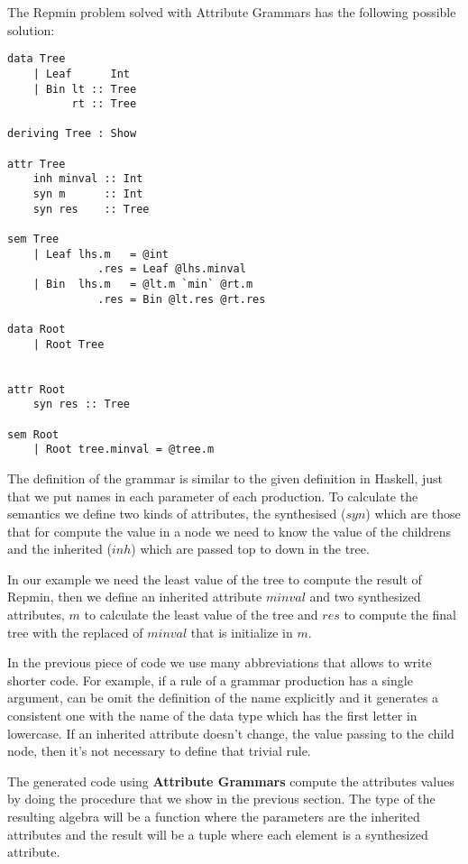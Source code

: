 \documentclass[a4paper,10pt]{article}
\begin{document}
The Repmin problem solved with Attribute Grammars has the following possible solution:

\begin{lstlisting}
data Tree
    | Leaf      Int
    | Bin lt :: Tree
	      rt :: Tree

deriving Tree : Show
	  
attr Tree
    inh minval :: Int
    syn m      :: Int
    syn res    :: Tree
      
sem Tree
    | Leaf lhs.m   = @int
              .res = Leaf @lhs.minval
	| Bin  lhs.m   = @lt.m `min` @rt.m
              .res = Bin @lt.res @rt.res

data Root
	| Root Tree
      
      
attr Root
	syn res :: Tree
      
sem Root
	| Root tree.minval = @tree.m
\end{lstlisting}

The definition of the grammar is similar to the given definition in Haskell, just that we put names
in each parameter of each production. To calculate the semantics we define two kinds of attributes,
the synthesised ($syn$) which are those that for compute the value in a node we need to know the value
of the childrens and the inherited ($inh$) which are passed top to down in the tree.

In our example we need the least value of the tree to compute the result of Repmin, then we define
an inherited attribute $minval$ and two synthesized attributes, $m$ to calculate the least value
of the tree and $res$ to compute the final tree with the replaced of $minval$ that is initialize
in $m$.
  
In the previous piece of code we use many abbreviations that allows to write shorter code. For example,
if a rule of a grammar production has a single argument, can be omit the definition of the name explicitly and it generates a consistent one with the name of the data type which has the first
letter in lowercase. If an inherited attribute doesn't change, the value passing to the child node,
then it's not necessary to define that trivial rule.

The generated code using \textbf{Attribute Grammars} compute the attributes values by doing the
procedure that we show in the previous section. The type of the resulting algebra will be a function
where the parameters are the inherited attributes and the result will be a tuple where each element
is a synthesized attribute.
  
\end{document}
